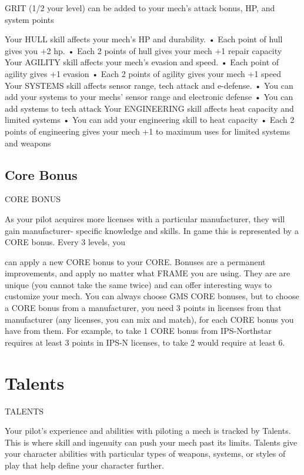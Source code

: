 GRIT (1/2 your level) can be added to your mech’s attack bonus, HP, and system points
 

Your HULL skill affects your mech’s HP and durability. 
       •  Each point of hull gives you +2 hp. 
       •  Each 2 points of hull gives your mech +1 repair capacity 
Your AGILITY skill affects your mech’s evasion and speed. 
       •  Each point of agility gives +1 evasion 
       •  Each 2 points of agility gives your mech +1 speed 
Your SYSTEMS skill affects sensor range, tech attack and e-defense. 
       •  You can add your systems to your mechs’ sensor range and electronic defense 
       •  You can add systems to tech attack 
Your ENGINEERING skill affects heat capacity and limited systems 
       •  You can add your engineering skill to heat capacity 
       •  Each 2 points of engineering gives your mech +1 to maximum uses for limited systems 
         and weapons 
\subsection{Core Bonus}
                                              CORE BONUS 

As your pilot acquires more licenses with a particular manufacturer, they will gain manufacturer- 
specific knowledge and skills. In game this is represented by a CORE bonus. Every 3 levels, you 

                                                                                                                 


can apply a new CORE bonus to your CORE. Bonuses are a permanent improvements, and  
apply no matter what FRAME you are using. They are are unique (you cannot take the same  
twice) and can offer interesting ways to customize your mech. You can always choose GMS  
CORE bonuses, but to choose a CORE bonus from a manufacturer, you need 3 points in licenses  
from that manufacturer (any licenses, you can mix and match), for each CORE bonus you have  
from them. For example, to take 1 CORE bonus from IPS-Northstar requires at least 3 points in  
IPS-N licenses, to take 2 would require at least 6.  

\section{Talents}
                                                 TALENTS  

Your pilot’s experience and abilities with piloting a mech is tracked by Talents. This is where skill  
and ingenuity can push your mech past its limits. Talents give your character abilities with  
particular types of weapons, systems, or styles of play that help define your character further.
 

